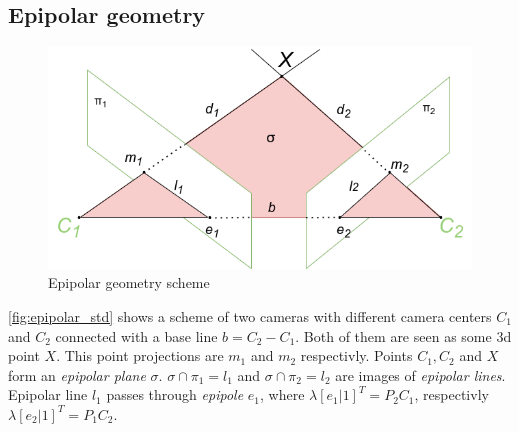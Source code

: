 \subsection{Epipolar geometry}
\begin{figure}[h]
    \centering
    \includegraphics[width=1\textwidth]{graphics/epipolar.png}
    \caption{Epipolar geometry scheme}
    \label{fig:epipolar_std}
\end{figure}
\autoref{fig:epipolar_std} shows a scheme of two cameras with different camera centers $C_1$ and $C_2$ connected with a base line $b = C_2 - C_1$. 
Both of them are seen as some 3d point $X$. 
This point projections are $m_1$ and $m_2$ respectivly. 
Points $C_1, C_2$ and $X$ form an \textit{epipolar plane} $\sigma$.
$\sigma \cap \pi_1 = l_1$ and $\sigma \cap \pi_2 = l_2$ are images of \textit{epipolar lines}. 
Epipolar line $l_1$ passes through \textit{epipole} $e_1$, where $\lambda [e_1 | 1]^T = P_2 C_1$, respectivly $\lambda [e_2 | 1]^T = P_1 C_2$.

